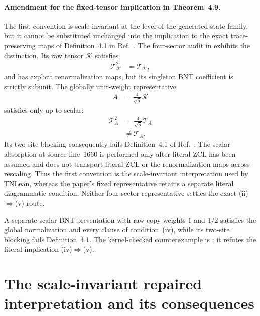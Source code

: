 \documentclass{article}
\begin{document}
\paragraph{Amendment for the fixed-tensor implication in Theorem~4.9.}
The first convention is scale invariant at the level of the generated state
family, but it cannot be substituted unchanged into the implication to the
exact trace-preserving maps of Definition~4.1 in
Ref.~\cite{Cirac2016MPDO_arXiv}. The four-sector audit in
 exhibits the distinction. Its
raw tensor $\mathcal K$ satisfies
\begin{align}
    \mathcal T_{\mathcal K}^2
    &=\mathcal T_{\mathcal K},
    \label{eq:zcl_four_sector_raw_idempotence}
\end{align}
and has explicit renormalization maps, but its singleton BNT coefficient is
strictly subunit. The globally unit-weight representative
\begin{align}
    A
    &=\frac4{\sqrt5}\mathcal K
    \label{eq:zcl_four_sector_unit_representative}
\end{align}
satisfies  only up to scalar:
\begin{align}
    \mathcal T_A^2
    &=\frac4{\sqrt5}\mathcal T_A
    \label{eq:zcl_four_sector_scaled_relation}\\
    &\ne\mathcal T_A.
    \label{eq:zcl_four_sector_not_literal}
\end{align}
Its two-site blocking consequently fails Definition~4.1 of
Ref.~\cite{Cirac2016MPDO_arXiv}. The scalar absorption at source line~1660 is
performed only after literal ZCL has been assumed and does not transport
literal ZCL or the renormalization maps across rescaling. Thus the first
convention is the scale-invariant interpretation used by TNLean, whereas the
paper's fixed representative retains a separate literal diagrammatic
condition. Neither four-sector representative settles the exact
(ii)$\Rightarrow$(v) route.

A separate scalar BNT presentation with raw copy weights $1$ and $1/2$
satisfies the global normalization and every clause of condition~(iv), while
its two-site blocking fails Definition~4.1. The kernel-checked counterexample
is
;
it refutes the literal implication (iv)$\Rightarrow$(v).

\section{The scale-invariant repaired interpretation and its consequences}
\end{document}
